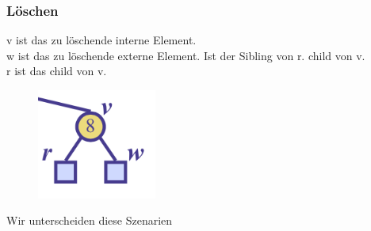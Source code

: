 \documentclass[a4paper,10pt]{report}
\begin{document}
\subsubsection{Löschen}
v ist das zu löschende interne Element.\\
w ist das zu löschende externe Element. Ist der Sibling von r. child von v. \\
r ist das child von v.
\begin{figure}[H]
	\begin{center}
  		\includegraphics[width=0.35\textwidth]{img/redblackdeletestructure.png}
	\end{center}
\end{figure}
Wir unterscheiden diese Szenarien
\end{document}
